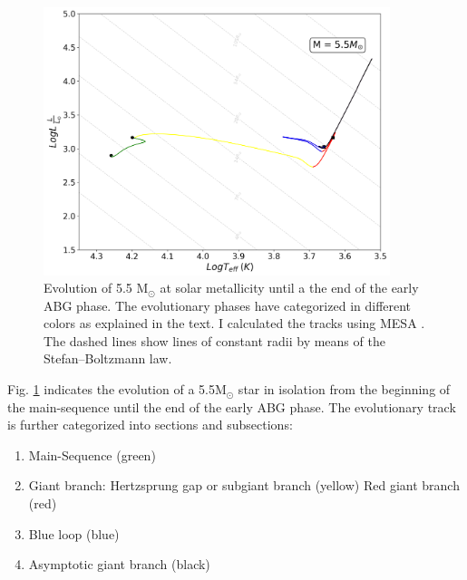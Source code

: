 \begin{figure}[H]
    \centering
    \includegraphics[width=0.9\textwidth]{Thesis/graphs/HR_evolution.pdf}
    \caption{Evolution of 5.5 M$_{\odot}$ at solar metallicity until a the end of the early ABG phase. The evolutionary phases have categorized in different colors as explained in the text. I calculated the tracks using MESA \citep{paxton2010modules,paxton2013modules,paxton2015modules,paxton2019modules}. The dashed lines show lines of constant radii by means of the Stefan–Boltzmann law.}
    \label{fig:HR_evolution}
\end{figure}
Fig. \ref{fig:HR_evolution} indicates the evolution of a 5.5M$_{\odot}$ star in isolation from the beginning of the main-sequence until the end of the early ABG phase. The evolutionary track is further categorized into sections and subsections: 
\begin{enumerate}
    \item Main-Sequence (green)
    \item Giant branch: 
        \subitem Hertzsprung gap or subgiant branch (yellow) 
        \subitem Red giant branch (red)
    \item Blue loop (blue)
    \item Asymptotic giant branch (black)
\end{enumerate}
